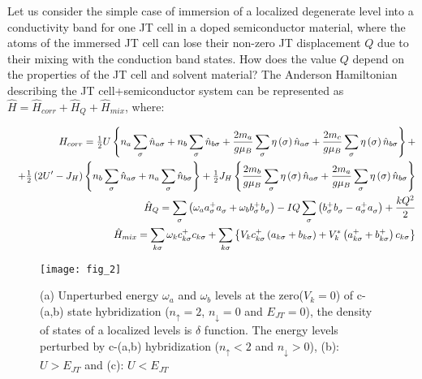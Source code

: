 \documentclass[%
 reprint,
groupedaddress,
 amsmath,amssymb,
 aps,
prb,
]{revtex4-1}
\begin{document}
Let us consider the simple case of immersion of a localized degenerate level into a conductivity band for one JT cell in a doped semiconductor material, where the atoms of the immersed JT cell can lose their non-zero JT displacement $Q$  due to their mixing with the conduction band states. How does the value $Q$ depend on the properties of the JT cell and solvent material? The Anderson Hamiltonian describing the JT cell+semiconductor system can be represented as $\hat H = \hat H_{corr}  + \hat H_Q  + \hat H_{mix} $, where:
\begin{widetext}
\begin{eqnarray}
&&H_{corr}  = {\textstyle{1 \over 2}}U\left\{ {n_a \sum\limits_\sigma  {\hat n_{a\sigma } }  + n_b \sum\limits_\sigma  {\hat n_{b\sigma } }  + \frac{{2m_a }}{{g\mu _B }}\sum\limits_\sigma  {\eta \left( \sigma  \right)\hat n_{a\sigma } }  + \frac{{2m_c }}{{g\mu _B }}\sum\limits_\sigma  {\eta \left( \sigma  \right)\hat n_{b\sigma } } } \right\} +  \\
\nonumber
&&+ {\textstyle{1 \over 2}}\left( {2U' - J_H } \right)\left\{ {n_b \sum\limits_\sigma  {\hat n_{a\sigma } }  + n_a \sum\limits_\sigma  {\hat n_{b\sigma } } } \right\} + {\textstyle{1 \over 2}}J_H \left\{ {\frac{{2m_b }}{{g\mu _B }}\sum\limits_\sigma  {\eta \left( \sigma  \right)\hat n_{a\sigma } }  + \frac{{2m_a }}{{g\mu _B }}\sum\limits_\sigma  {\eta \left( \sigma  \right)\hat n_{b\sigma } } } \right\}
\\ \label{eq:1}
&&\hat H_Q  = \sum\limits_\sigma  {\left( {\omega _a a_\sigma ^ +  a_\sigma ^{}  + \omega _b b_\sigma ^ +  b_\sigma ^{} } \right)}  - IQ\sum\limits_\sigma  {\left( {b_\sigma ^ +  b_\sigma ^{}  - a_\sigma ^ +  a_\sigma ^{} } \right)}  + \frac{{kQ^2 }}{2} \nonumber \\
&&\hat H_{mix}  = \sum\limits_{k\sigma } {\omega _k c_{k\sigma }^ +  c_{k\sigma } }  + \sum\limits_{k\sigma } {\left\{ {V_k c_{k\sigma }^ +  \left( {a_{k\sigma }  + b_{k\sigma } } \right) + V_k^* \left( {a_{k\sigma }^ +   + b_{k\sigma }^ +  } \right)c_{k\sigma } } \right\}}
\nonumber
\end{eqnarray}
\end{widetext}

\begin{figure*}
\texttt{[image: fig\_2]}
\caption{(a) Unperturbed energy $\omega_a$ and $\omega_b$ levels at the zero($V_k=0$) of c-(a,b) state hybridization ($n_{\uparrow}=2$, $n_{\downarrow}=0$ and $E_{JT}=0$), the density of states of a localized levels  is $\delta$ function. The energy levels perturbed by c-(a,b) hybridization ($n_{\uparrow}<2$ and $n_{\downarrow}>0$), (b): $U>E_{JT}$ and (c): $U<E_{JT}$}
\label{fig:2}
\end{figure*}
\end{document}
